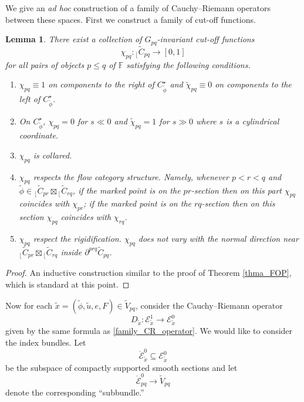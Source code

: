 \documentclass[reqno, 10pt]{amsart}
\numberwithin{equation}{section}
\numberwithin{equation}{section}
\renewcommand{\subset}{\subseteq}
\newtheorem{lemma}[thm]{Lemma}
\theoremstyle{definition}
\theoremstyle{remark}
\newcommand{\beqn}{\begin{equation*}}
\newcommand{\eeqn}{\end{equation*}}
\newcommand{\mb}{\mathbb}
\newcommand{\mc}{\mathcal}
\renewcommand{\outer}{{}_{\lfloor}}
\newcommand{\wt}{\widetilde}
\begin{document}
We give an {\it ad hoc} construction of a family of Cauchy--Riemann operators between these spaces. First we construct a family of cut-off functions.


\begin{lemma}\label{lemma_cut_off_function}
There exist a collection of $G_{pq}$-invariant cut-off functions
\beqn
\chi_{pq}: \outer \wt C_{pq} \to [0, 1]
\eeqn
for all pairs of objects $p \leq q$ of ${\mb F}$ satisfying the following conditions.
\begin{enumerate}

    \item $\chi_{pq} \equiv 1$ on components to the right of $C_{\wt \phi}^\star$ and $\wt \chi_{pq} \equiv 0$ on components to the left of $C_{\wt \phi}^\star$.

    \item On $C_{\wt \phi}^\star$, $\chi_{pq} = 0$ for $s \ll 0$ and $\wt \chi_{pq} = 1$ for $s \gg 0$ where $s$ is a cylindrical coordinate.

    \item $\chi_{pq}$ is collared.

    \item $\chi_{pq}$ respects the flow category structure. Namely, whenever $p< r < q$ and $\wt \phi \in \outer \wt C_{pr} \boxtimes \outer \wt C_{rq}$, if the marked point is on the $pr$-section then on this part $\chi_{pq}$ coincides with $\chi_{pr}$; if the marked point is on the $rq$-section then on this section $\chi_{pq}$ coincides with $\chi_{rq}$.

    \item $\chi_{pq}$ respect the rigidification. $\chi_{pq}$ does not vary with the normal direction near $\outer \wt C_{pr}\boxtimes \outer \wt C_{rq}$ inside $\partial^{prq} \wt C_{pq}$. 

\end{enumerate}
\end{lemma}

\begin{proof}
An inductive construction similar to the proof of Theorem \ref{thma_FOP}, which is standard at this point.
\end{proof}

Now for each $\wt x = (\wt \phi, \wt u, e, F) \in \wt V_{pq}$, consider the Cauchy--Riemann operator
\beqn
D_{\wt x}: {\mc E}_{\wt x}^1 \to {\mc E}_{\wt x}^0
\eeqn
given by the same formula as \eqref{family_CR_operator}. We would like to consider the index bundles. Let
\beqn
\mathring {\mc E}_{\wt x}^0 \subset {\mc E}_{\wt x}^0
\eeqn
be the subspace of compactly supported smooth sections and let 
\beqn
\mathring {\mc E}_{pq}^0 \to \wt V_{pq}
\eeqn
denote the corresponding ``subbundle.''
\end{document}
